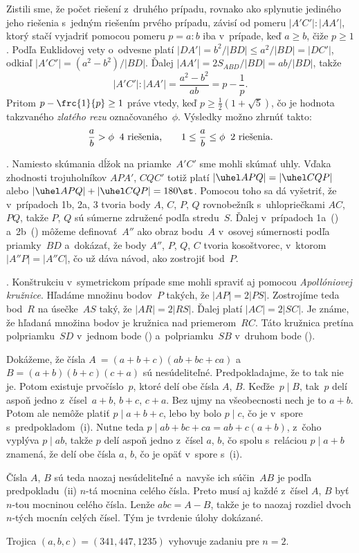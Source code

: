 {Zistili sme, že počet riešení z~druhého prípadu, rovnako ako
splynutie jediného jeho riešenia s~jedným riešením prvého prípadu,
závisí od pomeru $|A'C'|:|AA'|$, ktorý stačí vyjadriť pomocou
pomeru $p=a:b$ iba v~prípade, keď $a\ge b$, čiže $p\ge 1$.
Podľa Euklidovej vety o~odvesne platí $|DA'|=b^2/|BD|\le a^2/|BD|=|DC'|$,
odkiaľ $|A'C'| = (a^2-b^2) / |BD|$.
Ďalej $|AA'| = 2S_{ABD} / |BD| = ab / |BD|$, takže
$$
|A'C'|: |AA'| = \frac {a^2-b^2} {ab} = p- \frac {1} {p}.
$$
Pritom $p- \frc {1} {p} \ge 1$ práve vtedy, keď $p \ge\frac1{2} (1+ \sqrt {5})$,
čo je hodnota takzvaného {\it zlatého rezu\/} označovaného~$\phi$.
Výsledky možno zhrnúť takto:
$$
\frac ab> \phi\:\ \hbox {4 riešenia,} \qquad
1\le\frac ab\le \phi\:\ \hbox {2 riešenia.}
$$

.
Namiesto skúmania dĺžok na priamke~$A'C'$ sme
mohli skúmať uhly. Vďaka zhodnosti trojuholníkov $APA'$, $ CQC'$
totiž platí $|\uhel APQ| = |\uhel CQP|$ alebo $|\uhel APQ|+|\uhel CQP|=180\st$.
Pomocou toho sa dá vyšetriť, že v~prípadoch 1b, 2a, 3 tvoria body $A$, $C$, $P$, $Q$ rovnobežník
s~uhlopriečkami $AC$, $PQ$, takže $P$, $Q$ sú súmerne združené
podľa stredu~$S$. Ďalej v~prípadoch 1a~(\obr) a~2b~(\obr)
môžeme definovať~$A''$ ako obraz bodu~$A$
v~osovej súmernosti podľa priamky~$BD$ a~dokázať, že body $A''$, $P$, $Q$, $C$ tvoria
kosoštvorec, v~ktorom $|A''P| = |A''C|$, čo už dáva návod, ako
zostrojiť bod~$P$.
%
\vadjust{\vskip-\baselineskip}

.
Konštrukciu v~symetrickom prípade sme mohli spraviť
aj pomocou {\it Apollóniovej kružnice}. Hľadáme množinu bodov~$P$
takých, že $|AP| = 2 |PS|$. Zostrojíme teda bod~$R$ na úsečke~$AS$
taký, že $|AR| = 2 |RS|$. Ďalej platí $|AC| = 2 |SC|$. Je známe, že
hľadaná množina bodov je kružnica nad priemerom~$RC$. Táto
kružnica pretína polpriamku~$SD$ v~jednom bode (\obr)
a~polpriamku~$SB$ v~druhom bode (\obr).
%
}

{%
Dokážeme, že čísla $A~= (a+b+c) (ab+bc+ca)$
a~$B = (a+b) (b+c) (c+a)$ sú nesúdeliteľné. Predpokladajme, že to tak
nie je. Potom existuje prvočíslo~$p$, ktoré delí obe čísla $A$, $B$.
Keďže~$p \mid B$, tak~$p$ delí aspoň jedno z~čísel~$a+b$, $b+c$,
$c+a$. Bez ujmy na všeobecnosti nech je to $a+b$. Potom ale nemôže
platiť $p \mid a+b+c$, lebo by bolo $p \mid c$, čo je v~spore s~predpokladom~(i).
Nutne teda $p \mid ab+bc+ca = ab+c (a+b)$, z~čoho vyplýva $p \mid ab$, takže $p$ delí
aspoň jedno z~čísel $a$, $b$, čo spolu s~reláciou $p \mid a+b$ znamená, že
delí obe čísla $a$, $b$, čo je opäť v~spore s~(i).

Čísla $A$, $B$ sú teda naozaj nesúdeliteľné
a~navyše ich súčin~$AB$ je podľa predpokladu~(ii)
$n$-tá mocnina celého čísla. Preto musí aj každé z~čísel $A$, $B$ byť $n$-tou
mocninou celého čísla. Lenže $abc = A-B$, takže je to naozaj rozdiel
dvoch $n$-tých mocnín celých čísel. Tým je tvrdenie úlohy dokázané.

\poznamka
Trojica $(a, b, c) = (341, 447, 1235)$ vyhovuje zadaniu pre $n = 2$.
}

